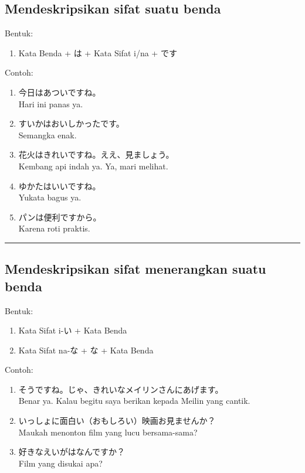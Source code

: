 \subsection*{
    Mendeskripsikan sifat suatu benda
}
Bentuk:
\begin{enumerate}
    \item Kata Benda + は + Kata Sifat i/na + です
\end{enumerate}
Contoh: 
\begin{enumerate}
    \item 今日はあついですね。
    \\ Hari ini panas ya.
    \item すいかはおいしかったです。
    \\ Semangka enak.
    \item 花火はきれいですね。ええ、見ましょう。
    \\ Kembang api indah ya. Ya, mari melihat.
    \item ゆかたはいいですね。
    \\ Yukata bagus ya.
    \item パンは便利ですから。
    \\ Karena roti praktis.
\end{enumerate}

\vspace{0.2cm}\hrule height 1pt\vspace{0.2cm}

\newpage
\subsection*{
    Mendeskripsikan sifat menerangkan suatu benda
}
Bentuk:
\begin{enumerate}
    \item Kata Sifat i-い + Kata Benda
    \item Kata Sifat na-な + な + Kata Benda
\end{enumerate}
Contoh: 
\begin{enumerate}
    \item そうですね。じゃ、きれいなメイリンさんにあげます。
    \\ Benar ya. Kalau begitu saya berikan kepada Meilin yang cantik.
    \item いっしょに面白い（おもしろい）映画お見ませんか？
    \\ Maukah menonton film yang lucu bersama-sama?
    \item 好きなえいがはなんですか？
    \\ Film yang disukai apa?
\end{enumerate}

